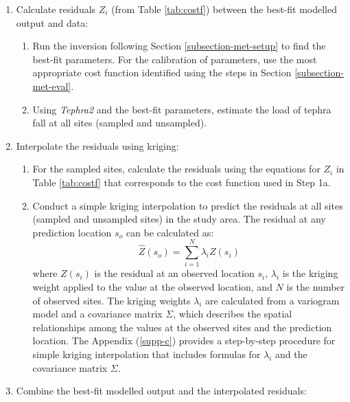 \begin{enumerate}

    \item 
    Calculate residuals $Z_{i}$ (from Table \ref{tab:costf}) between the best-fit modelled output and data:
    
    \begin{enumerate}
        \item
        Run the inversion following Section \ref{subsection-met-setup} to find the best-fit parameters. For the calibration of parameters, use the most appropriate cost function identified using the steps in Section \ref{subsection-met-eval}.
    
        \item 
        Using \textit{Tephra2} and the best-fit parameters, estimate the load of tephra fall at all sites (sampled and unsampled).
    \end{enumerate}

    \item 
    Interpolate the residuals using kriging:
    
    \begin{enumerate}
    \item
    For the sampled sites, calculate the residuals using the equations for $Z_{i}$ in Table \ref{tab:costf} that corresponds to the cost function used in Step 1a.
    
    \item 
    Conduct a simple kriging interpolation to predict the residuals at all sites (sampled and unsampled sites) in the study area. The residual at any prediction location $s_{o}$ can be calculated as:
    \begin{equation} \label{eq:simpkrigz}
    \hat{Z}(s_{o}) = \sum_{i=1}^{N} \lambda_{i} Z(s_{i}) 
    \end{equation} 
    where $Z(s_{i})$ is the residual at an observed location $s_{i}$, $\lambda_{i}$ is the kriging weight applied to the value at the observed location, and $N$ is the number of observed sites. The kriging weights $\lambda_{i}$ are calculated from a variogram model and a covariance matrix $\Sigma$, which describes the spatial relationships among the values at the observed sites and the prediction location. The Appendix (\ref{supp-c}) provides a step-by-step procedure for simple kriging interpolation that includes formulas for $\lambda_{i}$ and the covariance matrix $\Sigma$.
    \end{enumerate}
    
    \item 
    Combine the best-fit modelled output and the interpolated residuals:
    

\end{enumerate}
